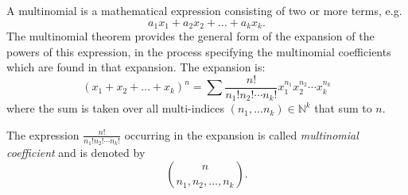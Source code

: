 \documentclass[12pt]{article}
\begin{document}
A multinomial is a mathematical expression consisting of two or more terms, e.g.
$$a_1 x_1 + a_2 x_2 + \ldots + a_k x_k.$$
The multinomial theorem provides the general form of the expansion of  the powers of this
expression, in the process specifying the multinomial coefficients which are found in that expansion. The expansion is:
\begin{equation}
(x_1 + x_2 + \ldots + x_k)^n =
\sum \frac{n!}{n_1! n_2! \dotsb n_k!} x_1^{n_1} x_2^{n_2} \cdots x_k^{n_k}
\end{equation}
where the sum is taken over all multi-indices $(n_1, \ldots n_k)\in\mathbb{N}^k$  that 
sum to $n$.

The expression $\frac{n!}{n_1! n_2! \cdots n_k!}$ occurring in the expansion is called \emph{multinomial coefficient} and is denoted by
\begin{equation*}
\binom{n}{n_1, n_2, \dotsc, n_k}.
\end{equation*}
\end{document}
